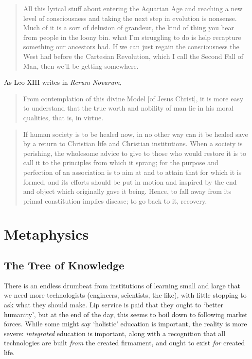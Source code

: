 \documentclass[letterpaper]{article}
\begin{document}
\begin{quote}
  All this lyrical stuff about entering the Aquarian Age and reaching a new level of consciousness and taking the next step in evolution is nonsense. Much of it is a sort of delusion of grandeur, the kind of thing you hear from people in the loony bin. what I'm struggling to do is help recapture something our ancestors had. If we can just regain the consciousness the West had before the Cartesian Revolution, which I call the Second Fall of Man, then we'll be getting somewhere.

\end{quote}

As Leo XIII writes in \textit{Rerum Novarum},

\begin{quote}
  From contemplation of this divine Model [of Jesus Christ], it is more easy to understand that the true worth and nobility of man lie in his moral qualities, that is, in virtue.
\end{quote}

\begin{quote}
  If human society is to be healed now, in no other way can it be healed save by a return to Christian life and Christian institutions. When a society is perishing, the wholesome advice to give to those who would restore it is to call it to the principles from which it sprang; for the purpose and perfection of an association is to aim at and to attain that for which it is formed, and its efforts should be put in motion and inspired by the end and object which originally gave it being. Hence, to fall away from its primal constitution implies disease; to go back to it, recovery.
\end{quote}

\section{Metaphysics}

\subsection{The Tree of Knowledge}

There is an endless drumbeat from institutions of learning small and large that we need more technologists (engineers, scientists, the like), with little stopping to ask what they should make. Lip service is paid that they ought to `better humanity', but at the end of the day, this seems to boil down to following market forces. While some might say `holistic' education is important, the reality is more severe: \textit{integrated} education is important, along with a recognition that all technologies are built \textit{from} the created firmament, and ought to exist \textit{for} created life.
\end{document}

